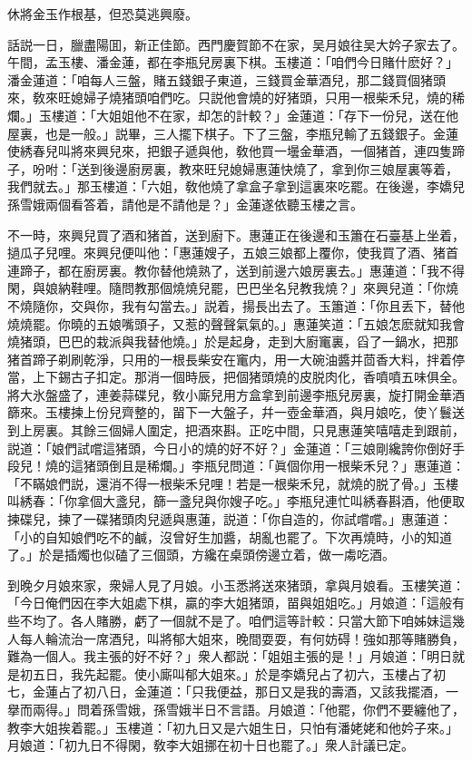 休將金玉作根基，但恐莫逃興廢。

話説一日，臘盡陽囬，新正佳節。西門慶賀節不在家，吴月娘往吴大妗子家去了。午間，孟玉樓、潘金蓮，都在李瓶兒房裏下棋。玉樓道：「咱們今日賭什麽好？」潘金蓮道：「咱每人三盤，賭五錢銀子東道，三錢買金華酒兒，那二錢買個猪頭來，敎來旺媳婦子燒猪頭咱們吃。只説他會燒的好猪頭，只用一根柴禾兒，燒的稀爛。」玉樓道：「大姐姐他不在家，却怎的計較？」金蓮道：「存下一份兒，送在他屋裏，也是一般。」説畢，三人擺下棋子。下了三盤，李瓶兒輸了五錢銀子。金蓮使綉春兒叫將來興兒來，把銀子遞與他，敎他買一壜金華酒，一個猪首，連四隻蹄子，吩咐：「送到後邊廚房裏，教來旺兒媳婦惠蓮快燒了，拿到你三娘屋裏等着，我們就去。」那玉樓道：「六姐，敎他燒了拿盒子拿到這裏來吃罷。在後邊，李嬌兒孫雪娥兩個看答着，請他是不請他是？」金蓮遂依聽玉樓之言。

不一時，來興兒買了酒和猪首，送到廚下。惠蓮正在後邊和玉簫在石臺基上坐着，撾瓜子兒哩。來興兒便叫他：「惠蓮嫂子，五娘三娘都上覆你，使我買了酒、猪首連蹄子，都在廚房裏。教你替他燒熟了，送到前邊六娘房裏去。」惠蓮道：「我不得閑，與娘納鞋哩。隨問教那個燒燒兒罷，巴巴坐名兒教我燒？」來興兒道：「你燒不燒隨你，交與你，我有勾當去。」説着，揚長出去了。玉簫道：「你且丢下，替他燒燒罷。你曉的五娘嘴頭子，又惹的聲聲氣氣的。」惠蓮笑道：「五娘怎麽就知我會燒猪頭，巴巴的栽派與我替他燒。」於是起身，走到大廚竃裏，舀了一鍋水，把那猪首蹄子剃刷乾淨，只用的一根長柴安在竃内，用一大碗油醬并茴香大料，拌着停當，上下錫古子扣定。那消一個時辰，把個猪頭燒的皮脱肉化，香噴噴五味俱全。將大氷盤盛了，連姜蒜碟兒，敎小廝兒用方盒拿到前邊李瓶兒房裏，旋打開金華酒篩來。玉樓揀上份兒齊整的，㽞下一大盤子，幷一壺金華酒，與月娘吃，使丫鬟送到上房裏。其餘三個婦人圍定，把酒來斟。正吃中間，只見惠蓮笑嘻嘻走到跟前，説道：「娘們試嚐這猪頭，今日小的燒的好不好？」金蓮道：「三娘剛纔誇你倒好手段兒！燒的這猪頭倒且是稀爛。」李瓶兒問道：「眞個你用一根柴禾兒？」惠蓮道：「不瞞娘們説，還消不得一根柴禾兒哩！若是一根柴禾兒，就燒的脱了骨。」玉樓叫綉春：「你拿個大盞兒，篩一盞兒與你嫂子吃。」李瓶兒連忙叫綉春斟酒，他便取揀碟兒，揀了一碟猪頭肉兒遞與惠蓮，説道：「你自造的，你試嚐嚐。」惠蓮道：「小的自知娘們吃不的鹹，沒曾好生加醬，胡亂也罷了。下次再燒時，小的知道了。」於是插燭也似磕了三個頭，方纔在桌頭傍邊立着，做一䖏吃酒。

到晚夕月娘來家，衆婦人見了月娘。小玉悉將送來猪頭，拿與月娘看。玉樓笑道：「今日俺們因在李大姐處下棋，贏的李大姐猪頭，㽞與姐姐吃。」月娘道：「這般有些不均了。各人賭勝，虧了一個就不是了。咱們這等計較：只當大節下咱姊妹這幾人每人輪流治一席酒兒，叫將郁大姐來，晚間耍耍，有何妨碍！強如那等賭勝負，難為一個人。我主張的好不好？」衆人都説：「姐姐主張的是！」月娘道：「明日就是初五日，我先起罷。使小廝叫郁大姐來。」於是李嬌兒占了初六，玉樓占了初七，金蓮占了初八日，金蓮道：「只我便益，那日又是我的壽酒，又該我擺酒，一擧而兩得。」問着孫雪娥，孫雪娥半日不言語。月娘道：「他罷，你們不要纏他了，教李大姐挨着罷。」玉樓道：「初九日又是六姐生日，只怕有潘姥姥和他妗子來。」月娘道：「初九日不得閑，敎李大姐挪在初十日也罷了。」衆人計議已定。

